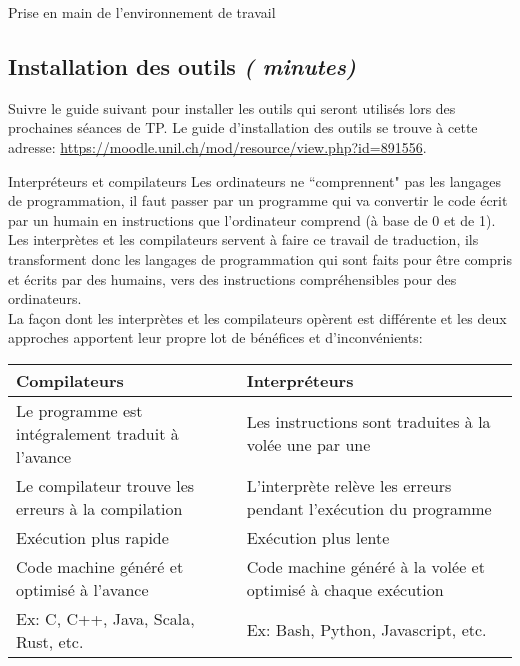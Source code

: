 \begin{section}{Prise en main de l'environnement de travail}
    \subsection{Installation des outils \textit{(\faClock {} minutes)}} 
        Suivre le guide suivant pour installer les outils qui seront utilisés lors des prochaines séances de TP. Le guide d'installation des outils se trouve à cette adresse: \url{https://moodle.unil.ch/mod/resource/view.php?id=891556}.
\end{section}
\begin{section}{Interpréteurs et compilateurs}
    Les ordinateurs ne ``comprennent" pas les langages de programmation, il faut passer par un programme qui va convertir le code écrit par un humain en instructions que l'ordinateur comprend (à base de 0 et de 1).
\\
Les interprètes et les compilateurs servent à faire ce travail de traduction, ils transforment donc les langages de programmation qui sont faits pour être compris et écrits par des humains, vers des instructions compréhensibles pour des ordinateurs.
\\
La façon dont les interprètes et les compilateurs opèrent est différente et les deux approches apportent leur propre lot de bénéfices et d'inconvénients:\\
    \begin{tabular}{| C{0.45\textwidth} | C{0.45\textwidth} |} 
        \hline
        \textbf{Compilateurs} & \textbf{Interpréteurs}\\ [0.5ex]
        \hline
        Le programme est intégralement traduit à l'avance & Les instructions sont traduites à la volée une par une  \\
        \hline
        Le compilateur trouve les erreurs à la compilation & L'interprète relève les erreurs pendant l'exécution du programme  \\
        \hline
        Exécution plus rapide & Exécution plus lente \\
        \hline
        Code machine généré et optimisé à l'avance & Code machine généré à la volée et optimisé à chaque exécution  \\
        \hline
        Ex: C, C++, Java, Scala, Rust, etc. & Ex: Bash, Python, Javascript, etc. \\
        \hline
    \end{tabular}
    \\\\

\end{section}
